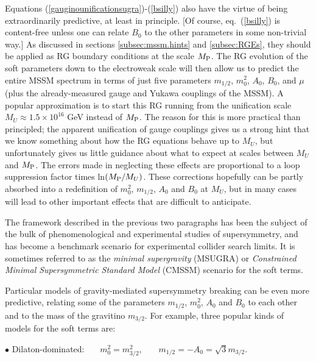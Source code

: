 \documentclass[12pt]{article}
\def\MPlanck{M_{\rm P}}
\begin{document}
Equations (\ref{gauginounificationsugra})-(\ref{bsilly}) also have the 
virtue of being extraordinarily predictive, at least in principle. 
[Of course, 
eq.~(\ref{bsilly}) is 
content-free unless one can relate $B_0$ to the other parameters in some 
non-trivial way.] As discussed in sections \ref{subsec:mssm.hints} and 
\ref{subsec:RGEs}, they should be applied as RG boundary conditions at the 
scale $\MPlanck$. The RG evolution of the soft parameters down to the 
electroweak scale will then allow us to predict the entire MSSM spectrum 
in terms of just five parameters $m_{1/2}$, $m_0^2$, $A_0$, $B_0$, and 
$\mu$ (plus the already-measured gauge and Yukawa couplings of the MSSM). 
A popular approximation is to start this RG running from the unification 
scale $M_U\approx 1.5\times 10^{16}$ GeV instead of $\MPlanck$. The reason 
for this is more practical than principled; the apparent unification of 
gauge couplings gives us a strong hint that we know something about how 
the RG equations behave up to $M_U$, but unfortunately gives us little 
guidance about what to expect at scales between $M_U$ and $\MPlanck$. The 
errors made in neglecting these effects are proportional to a loop 
suppression factor times ln$(\MPlanck/M_U)$. These corrections hopefully 
can be partly absorbed into a redefinition of $m_0^2$, $m_{1/2}$, $A_0$ 
and $B_0$ at $M_U$, but in many cases will lead to other important effects 
\cite{PP} that are difficult to anticipate. 

The framework described in the previous two paragraphs has been 
the subject of the bulk of phenomenological and experimental studies of supersymmetry,
and has become a benchmark scenario for experimental collider 
search limits. It 
is sometimes referred to as the {\it minimal supergravity} (MSUGRA) 
or {\it Constrained Minimal Supersymmetric Standard Model} (CMSSM) 
scenario for the soft terms. 

Particular models of gravity-mediated supersymmetry breaking can be even 
more predictive, relating some of the parameters $m_{1/2}$, $m_0^2$, $A_0$ 
and $B_0$ to each other and to the mass of the gravitino $m_{3/2}$. For 
example, three popular kinds of models for the soft terms are:

\vspace{.08in}

$\bullet$
Dilaton-dominated: \cite{dilatondominated}~~~$m^2_0 =
m^2_{3/2}$,~~~~$m_{1/2} = -A_0 = {\sqrt 3} m_{3/2}$.

\vspace{.02in}
\end{document}

